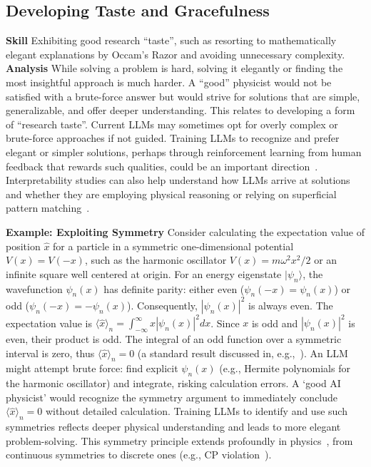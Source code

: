 \subsection{Developing Taste and Gracefulness}
\label{sec:good_ai_physicist}
\textbf{Skill} Exhibiting good research ``taste'', such as resorting to mathematically elegant explanations by Occam's Razor and avoiding unnecessary complexity.
\textbf{Analysis} While solving a problem is hard, solving it elegantly or finding the most insightful approach is much harder. A ``good'' physicist would not be satisfied with a brute-force answer but would strive for solutions that are simple, generalizable, and offer deeper understanding. This relates to developing a form of ``research taste''. Current LLMs may sometimes opt for overly complex or brute-force approaches if not guided. Training LLMs to recognize and prefer elegant or simpler solutions, perhaps through reinforcement learning from human feedback that rewards such qualities, could be an important direction~\cite{Bai2022Training}. Interpretability studies can also help understand how LLMs arrive at solutions and whether they are employing physical reasoning or relying on superficial pattern matching~\cite{Hanna2023How}.

\textbf{Example: Exploiting Symmetry}
Consider calculating the expectation value of position $\hat{x}$ for a particle in a symmetric one-dimensional potential $V(x) = V(-x)$, such as the harmonic oscillator $V(x) = m\omega^2 x^2/2$ or an infinite square well centered at origin. For an energy eigenstate $|\psi_n\rangle$, the wavefunction $\psi_n(x)$ has definite parity: either even ($\psi_n(-x) = \psi_n(x)$) or odd ($\psi_n(-x) = -\psi_n(x)$). Consequently, $|\psi_n(x)|^2$ is always even. The expectation value is $\langle \hat{x} \rangle_n = \int_{-\infty}^{\infty} x |\psi_n(x)|^2 dx$. Since $x$ is odd and $|\psi_n(x)|^2$ is even, their product is odd. The integral of an odd function over a symmetric interval is zero, thus $\langle \hat{x} \rangle_n = 0$ (a standard result discussed in, e.g.,~\cite{Shankar1994Principles}).
An LLM might attempt brute force: find explicit $\psi_n(x)$ (e.g., Hermite polynomials for the harmonic oscillator) and integrate, risking calculation errors. A `good AI physicist' would recognize the symmetry argument to immediately conclude $\langle \hat{x} \rangle_n = 0$ without detailed calculation. Training LLMs to identify and use such symmetries reflects deeper physical understanding and leads to more elegant problem-solving. This symmetry principle extends profoundly in physics~\cite{Gross1996Role}, from continuous symmetries to discrete ones (e.g., CP violation~\cite{Lee1956Question}).
